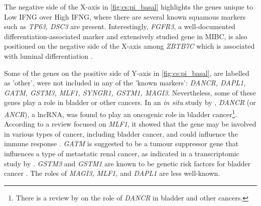 The negative side of the X-axis in \cref{fig:cs:pi_basal} highlights the genes unique to Low IFNG over High IFNG, where there are several known squamous markers such as \textit{TP63, DSC3} are present. Interestingly, \textit{FGFR3}, a well-documented differentiation-associated marker and extensively studied gene in MIBC, is also positioned on the negative side of the X-axis among \textit{ZBTB7C} which is associated with luminal differentiation \citep{Ramal2024-ha}.

Some of the genes on the positive side of Y-axis in \cref{fig:cs:pi_basal}, 
are labelled as 'other', were not included in any of the 'known markers': \textit{DANCR, DAPL1, GATM, GSTM3, MLF1, SYNGR1, GSTM1, MAGI3}. Nevertheless, some of these genes play a role in bladder or other cancers. In an \textit{in situ} study by \citet{Zhan2018-um}, \textit{DANCR} (or \textit{ANCR}), a \acrfull{lncRNA}, was found to play an oncogenic role in bladder cancer\footnote{There is a review by \citet{Wang2021-gn} on the role of \textit{DANCR} in bladder and other cancers.}. According to a review focused on \textit{MLF1}, it showed that the gene may be involved in various types of cancer, including bladder cancer, and could influence the immune response \citep{Li2023-mk}. \textit{GATM} is suggested to be a tumour suppressor gene that influences a type of metastatic renal cancer, as indicated in a transcriptomic study by \citet{Jee2022-wi}. \textit{GSTM3} and \textit{GSTM1} are known to be genetic risk factors for bladder cancer \citep{Schnakenberg2000-cu}. The roles of \textit{MAGI3, MLF1,} and \textit{DAPL1} are less well-known.

